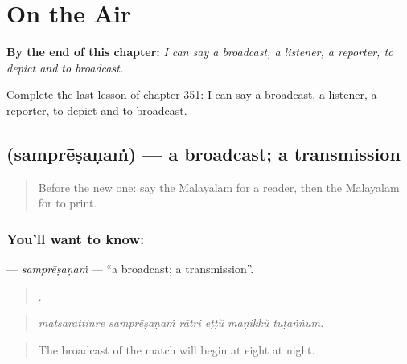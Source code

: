 
\chapter{On the Air}
\label{ch:ml-on-the-air}

\begin{chapteropening}
\textbf{By the end of this chapter:} \emph{I can say a broadcast, a listener, a reporter, to depict and to broadcast.}

Complete the last lesson of chapter 351: I can say a broadcast, a listener, a reporter, to depict and to broadcast.
\end{chapteropening}

\section[\texorpdfstring{\ml{സംപ്രേഷണം} (samprēṣaṇaṁ)}{സംപ്രേഷണം (samprēṣaṇaṁ)}]{ (samprēṣaṇaṁ) — a broadcast; a transmission}

\label{lesson:ML-C351-sampresanam}



\begin{quote}
Before the new one: say the Malayalam for a reader, then the Malayalam for to print.
\end{quote}

\subsection*{You'll want to know: }
\textbf{} — \emph{samprēṣaṇaṁ} — \textquotedblleft{}a broadcast; a transmission\textquotedblright{}.

\begin{quote}
     .
\end{quote}

\begin{quote}
\emph{matsarattinṟe samprēṣaṇaṁ rātri eṭṭŭ maṇikkŭ tuṭaṅṅuṁ.}
\end{quote}

\begin{quote}
The broadcast of the match will begin at eight at night.
\end{quote}


